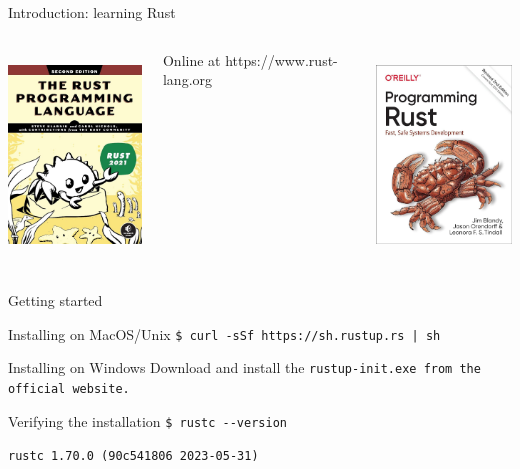 \begin{frame}{Introduction: learning Rust}
    \begin{columns}[t, onlytextwidth]
        \centering
        \includegraphics[height=5.5cm, keepaspectratio]{images/rust-book.jpg}

        \small Online at https://www.rust-lang.org

        \centering
        \includegraphics[height=5.5cm, keepaspectratio]{images/programming-rust.jpg}
    \end{columns}
\end{frame}

\begin{frame}[containsverbatim]{Getting started}
    \small
    \begin{block}{Installing on MacOS/Unix}
        \tt{\$ curl -sSf https://sh.rustup.rs | sh}
    \end{block}

    \begin{block}{Installing on Windows}
        Download and install the \tt{rustup-init.exe} from the official website. 
    \end{block}

    \begin{alertblock}{Verifying the installation}
        \tt{\$ rustc -{}-version}
        
        \tt{rustc 1.70.0 (90c541806 2023-05-31)}
    \end{alertblock}
\end{frame}

